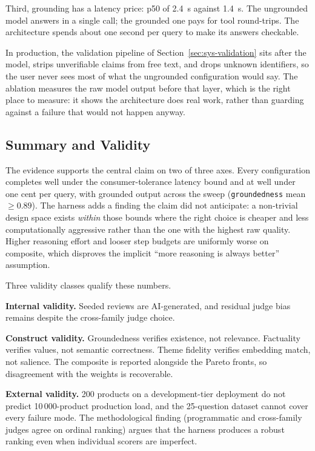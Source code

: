 Third, grounding has a latency price: p50 of 2.4~s against
1.4~s. The ungrounded model answers in a single call; the
grounded one pays for tool round-trips. The architecture spends
about one second per query to make its answers checkable.

In production, the validation pipeline of
Section~\ref{sec:sys-validation} sits after the model, strips
unverifiable claims from free text, and drops unknown
identifiers, so the user never sees most of what the ungrounded
configuration would say. The ablation measures the raw model
output before that layer, which is the right place to measure:
it shows the architecture does real work, rather than guarding
against a failure that would not happen anyway.

\subsection{Summary and Validity}
\label{subsec:results-summary}

The evidence supports the central claim on two of three axes.
Every configuration completes well under the consumer-tolerance
latency bound and at well under one cent per query, with
grounded output across the sweep (\texttt{groundedness} mean
$\ge 0.89$). The harness adds a finding the claim did not
anticipate: a non-trivial design space exists \emph{within}
those bounds where the right choice is cheaper and less
computationally aggressive rather than the one with the highest
raw quality. Higher reasoning effort and looser step budgets
are uniformly worse on composite, which disproves the implicit
``more reasoning is always better'' assumption.

Three validity classes qualify these numbers.

\textbf{Internal validity.} Seeded reviews are AI-generated, and
residual judge bias remains despite the cross-family judge
choice.

\textbf{Construct validity.} Groundedness verifies existence,
not relevance. Factuality verifies values, not semantic
correctness. Theme fidelity verifies embedding match, not
salience. The composite is reported alongside the Pareto fronts,
so disagreement with the weights is recoverable.

\textbf{External validity.} 200 products on a development-tier
deployment do not predict 10\,000-product production load, and
the 25-question dataset cannot cover every failure mode. The
methodological finding (programmatic and cross-family judges
agree on ordinal ranking) argues that the harness produces a robust
ranking even when individual scorers are imperfect.

